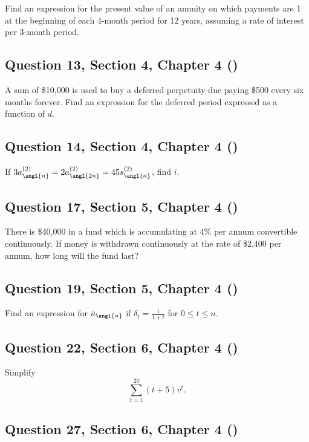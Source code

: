 \documentclass[12pt, a4paper]{article}
\begin{document}
\noindent Find an expression for the present value of an annuity on which payments are 1 at the beginning of each 4-month period for 12 years, assuming a rate of interest per 3-month period.

\subsection*{Question 13, Section 4, Chapter 4  (\cite{toi3rd})}

\noindent A sum of \$10{,}000 is used to buy a deferred perpetuity-due paying \$500 every six months forever. Find an expression for the deferred period expressed as a function of \( d. \)

\subsection*{Question 14, Section 4, Chapter 4  (\cite{toi3rd})}

\noindent If \( 3 a_{\angl{n}}^{(2)} = 2 a_{\angl{2n}}^{(2)} = 45 s_{\angl{n}}^{(2)} \), find \( i. \)

\subsection*{Question 17, Section 5, Chapter 4  (\cite{toi3rd})}

\noindent There is \$40{,}000 in a fund which is accumulating at 4\% per annum convertible continuously. If money is withdrawn continuously at the rate of \$2{,}400 per annum, how long will the fund last?

\subsection*{Question 19, Section 5, Chapter 4  (\cite{toi3rd})}

\noindent Find an expression for \( \bar{a}_{\angl{n}} \) if \( \delta_t = \frac{1}{1 + t} \) for \( 0 \le t \le n. \)

\subsection*{Question 22, Section 6, Chapter 4  (\cite{toi3rd})}

\noindent Simplify
\[
\sum_{t=1}^{20} (t + 5)v^t.
\]

\subsection*{Question 27, Section 6, Chapter 4  (\cite{toi3rd})}
\end{document}
